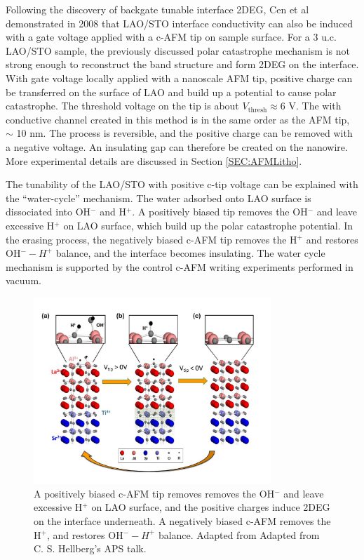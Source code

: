 \documentclass[pdflatex, sectionletters, 12pt]{pittetd}    %
\begin{document}
Following the discovery of backgate tunable interface 2DEG, Cen et al demonstrated in 2008 that LAO/STO interface conductivity can also be induced with a gate voltage applied with a c-AFM tip on sample surface\cite{cen2008nanoscale}. For a 3 u.c. LAO/STO sample, the previously discussed polar catastrophe mechanism is not strong enough to reconstruct the band structure and form 2DEG on the interface. With gate voltage locally applied with a nanoscale AFM tip, positive charge can be transferred on the surface of LAO and build up a potential to cause polar catastrophe. The threshold voltage on the tip is about $V_\mathrm{thresh} \approx 6$ V\cite{cen2008nanoscale}. The with conductive channel created in this method is in the same order as the AFM tip, $\sim$ 10 nm. The process is reversible, and the positive charge can be removed with a negative voltage. An insulating gap can therefore be created on the nanowire. More experimental details are discussed in Section \ref{SEC:AFMLitho}.

The tunability of the LAO/STO with positive c-tip voltage can be explained with the ``water-cycle'' mechanism\cite{bi2010water}. The water adsorbed onto LAO surface is dissociated into OH$^{-}$ and H$^{+}$. A positively biased tip removes the OH$^{-}$ and leave excessive H$^{+}$ on LAO surface, which build up the polar catastrophe potential. In the erasing process, the negatively biased c-AFM tip removes the H$^{+}$ and restores OH$^{-}-H^{+}$ balance, and the interface becomes insulating. The water cycle mechanism is supported by the control c-AFM writing experiments performed in vacuum\cite{bi2010water}.

\begin{figure}[h!]
	\centering
	\includegraphics[width=0.8\textwidth]{Drawing/WaterCycle.png}
	\caption{A positively biased c-AFM tip removes removes the OH$^{-}$ and leave excessive H$^{+}$ on LAO surface, and the positive charges induce 2DEG on the interface underneath. A negatively biased c-AFM removes the H$^{+}$, and restores OH$^{-}-H^{+}$ balance. Adapted from Adapted from C. S. Hellberg's APS talk.}
	\label{FIG:WaterCycle}
\end{figure}
\end{document}
